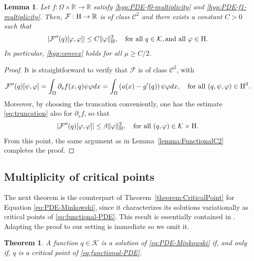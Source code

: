 \documentclass{article}
\newcommand{\boC}{\mathcal{C}}
\newcommand{\boK}{\mathcal{K}}
\newcommand{\R}{\mathbb{R}}
\newcommand{\boF}{\mathcal{F}}
\newcommand{\Hilb}{{\textnormal H}}
\newtheorem{theorem}{Theorem}[section]
\newtheorem{lemma}{Lemma}[section]
\theoremstyle{definition}
\begin{document}
\begin{lemma}\label{lemma:FunctionalC2-Dirichlet}
Let $f:\Omega\times\R\to\R$ satisfy \eqref{hyp:PDE-f0-multiplicity} and \eqref{hyp:PDE-f1-multiplicity}. Then, $\boF:\Hilb\to\R$ is of class $\boC^2$ and there exists a constant $C>0$ such that  \begin{equation}\label{bounded2der-PDE-Dirichlet}
    |\boF''(q)[\varphi,\varphi]|\leq C\|\varphi\|_{\Hilb}^2,\quad\text{for all }q\in \boK, \hbox{and all }\varphi\in\Hilb.
    \end{equation}
    In particular, \eqref{hyp:convex} holds for all $\mu\geq C/2$.
\end{lemma}
\begin{proof}
 It is straightforward to verify that $\boF$ is of class $\boC^2$, with
 \begin{equation*}
     \boF''(q)[\psi,\varphi]=\int_\Omega\partial_s f(x,q)\psi\varphi dx=\int_\Omega \left(a(x)- g'(q)\right)\psi\varphi dx,\quad\hbox{for all }(q,\psi,\varphi)\in\Hilb^3.
 \end{equation*}
Moreover, by choosing the truncation conveniently, one has the estimate \eqref{eq:truncation} also for $\partial_s f$, so that
 \begin{equation}
    \left| \boF''(q)[\varphi,\varphi]\right|\leq\beta \|\varphi\|_\Hilb^2,\quad\hbox{for all }(q,\varphi)\in\boK\times\Hilb.
 \end{equation}
From this point, the same argument as in Lemma~\ref{lemma:FunctionalC2} completes the proof.
\end{proof}


\subsection{Multiplicity of critical points}\label{Sect:Mink-Dirichlet}

The next theorem is the counterpart of Theorem~\ref{theorem:CriticalPoint} for Equation \eqref{eq:PDE-Minkowski}, since it characterizes its solutions variationally as critical points of \eqref{eq:functional-PDE}. This result is essentially contained in \cite[Theorem 2.1]{BerJebMaw}. Adapting the proof to our setting is immediate so we omit it.
\begin{theorem}\label{Th:criticalpoint-PDE}
    A function $q\in\boK$ is a solution of \eqref{eq:PDE-Minkowski} if, and only if, $q$ is a critical point of \eqref{eq:functional-PDE}.
\end{theorem}
\end{document}
